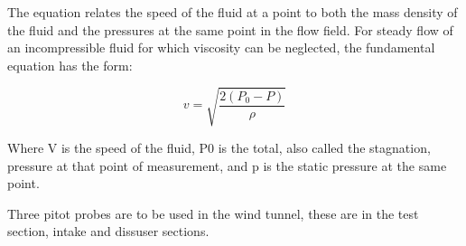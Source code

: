 The equation relates the speed of the fluid at a point to both the mass density of the fluid and the pressures at the same point in the flow field. For steady flow of an incompressible fluid for which viscosity can be neglected, the fundamental equation has the form:

$$ v = \sqrt{\frac{2(P_0 - P)}{\rho}}$$

Where V is the speed of the fluid, P0 is the total, also called the stagnation, pressure at that point of measurement, and p is the static pressure at the same point.

Three pitot probes are to be used in the wind tunnel, these are in the test section, intake and dissuser sections.